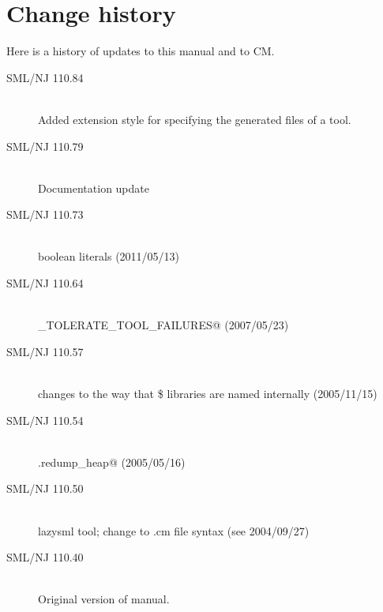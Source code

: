 %
\section{Change history}
\label{sec:changes}

Here is a history of updates to this manual and to CM.
\begin{description}
  \item[SML/NJ 110.84]
    \mbox{}\\[0.5em]
    Added \lstinline@RENAME@ extension style for specifying the
    generated files of a tool.
    
  \item[SML/NJ 110.79]
    \mbox{}\\[0.5em]
    Documentation update

  \item[SML/NJ 110.73]
    \mbox{}\\[0.5em]
    boolean literals (2011/05/13)

  \item[SML/NJ 110.64]
    \mbox{}\\[0.5em]
     \lstinline@CM_TOLERATE_TOOL_FAILURES@ (2007/05/23)
     
  \item[SML/NJ 110.57]
    \mbox{}\\[0.5em]
    changes to the way that \$ libraries are named internally (2005/11/15)

  \item[SML/NJ 110.54]
    \mbox{}\\[0.5em]
    \lstinline@CM.redump_heap@ (2005/05/16)

  \item[SML/NJ 110.50]
    \mbox{}\\[0.5em]
    lazysml tool; change to .cm file syntax (see 2004/09/27)
    
  \item[SML/NJ 110.40]
    \mbox{}\\[0.5em]
    Original version of manual.
\end{description}%
